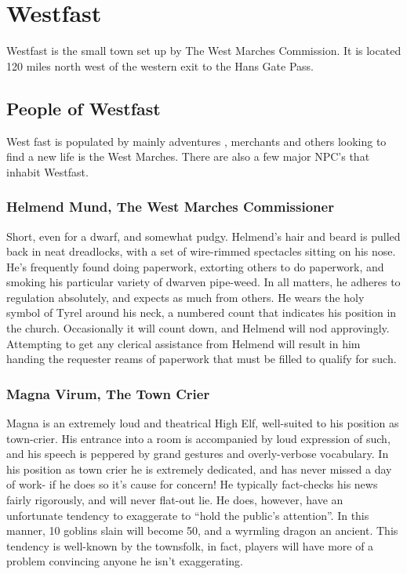 \chapter{Westfast}
Westfast is the small town set up by The West Marches Commission. It is located 120 miles north west of the western exit to the Hans Gate Pass. 
\section{People of Westfast}
West fast is populated by mainly adventures , merchants and others looking to find a new life is the West Marches. There are also a few major NPC's that inhabit Westfast.
\subsection{Helmend Mund, The West Marches Commissioner}
Short, even for a dwarf, and somewhat pudgy. Helmend’s hair and beard is pulled back in neat dreadlocks, with a set of wire-rimmed spectacles sitting on his nose. He’s frequently found doing paperwork, extorting others to do paperwork, and smoking his particular variety of dwarven pipe-weed. In all matters, he adheres to regulation absolutely, and expects as much from others. 
\newline
He wears the holy symbol of Tyrel around his neck, a numbered count that indicates his position in the church. Occasionally it will count down, and Helmend will nod approvingly. 
\newline
Attempting to get any clerical assistance from Helmend will result in him handing the requester reams of paperwork that must be filled to qualify for such.

\subsection{Magna Virum, The Town Crier}
Magna is an extremely loud and theatrical High Elf, well-suited to his position as town-crier. His entrance into a room is accompanied by loud expression of such, and his speech is peppered by grand gestures and overly-verbose vocabulary. 
\newline
In his position as town crier he is extremely dedicated, and has never missed a day of work- if he does so it’s cause for concern! He typically fact-checks his news fairly rigorously, and will never flat-out lie. He does, however, have an unfortunate tendency to exaggerate to “hold the public’s attention”. In this manner, 10 goblins slain will become 50, and a wyrmling dragon an ancient. This tendency is well-known by the townsfolk, in fact, players will have more of a problem convincing anyone he isn’t exaggerating.    
